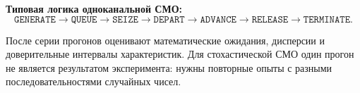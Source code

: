 \textbf{Типовая логика одноканальной СМО:}
\[
  \texttt{GENERATE} \to \texttt{QUEUE} \to \texttt{SEIZE} \to
  \texttt{DEPART} \to \texttt{ADVANCE} \to \texttt{RELEASE} \to \texttt{TERMINATE}.
\]

После серии прогонов оценивают математические ожидания, дисперсии и доверительные интервалы характеристик. Для стохастической СМО один прогон не является результатом эксперимента: нужны повторные опыты с разными последовательностями случайных чисел.

\clearpage
